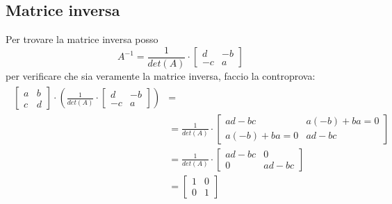 \documentclass[italian]{article}
\begin{document}
\subsection{Matrice inversa}
Per trovare la matrice inversa posso
\[
	A^{-1} = \frac{1}{det(A)} \cdot
	\begin{bmatrix}
		d & -b \\
		-c & a
	\end{bmatrix}
\]
per verificare che sia veramente la matrice inversa, faccio la controprova:
\begin{gather*}
	\begin{split}
		\begin{bmatrix}
			a & b \\
			c & d
		\end{bmatrix}
		\cdot
		\left(
			\frac{1}{det(A)} \cdot
			\begin{bmatrix}
				d & -b \\
				-c & a
			\end{bmatrix}
		\right) &= \\
		&= 
		\frac{1}{det(A)} \cdot
		\begin{bmatrix}
			ad-bc & a(-b) + ba = 0\\
			a(-b) + ba = 0 & ad-bc
		\end{bmatrix}\\
		&=
		\frac{1}{det(A)} \cdot
		\begin{bmatrix}
		ad-bc & 0\\
		0 & ad-bc
		\end{bmatrix}\\
		&=
		\begin{bmatrix}
			1 & 0 \\
			0 & 1
		\end{bmatrix}
	\end{split}
\end{gather*}

\newpage
\end{document}
